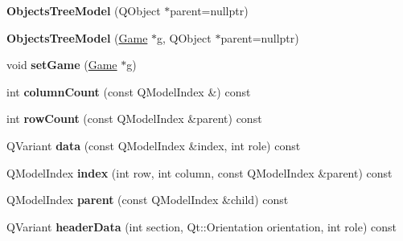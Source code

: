 \begin{DoxyCompactItemize}
\item 
\hypertarget{class_objects_tree_model_a4cc5d9d4f4a979715d93841b8d76c996}{{\bfseries \-Objects\-Tree\-Model} (\-Q\-Object $\ast$parent=nullptr)}\label{class_objects_tree_model_a4cc5d9d4f4a979715d93841b8d76c996}

\item 
\hypertarget{class_objects_tree_model_a0796ddf3bdd9fae95ac199b72e994465}{{\bfseries \-Objects\-Tree\-Model} (\hyperlink{class_game}{\-Game} $\ast$g, \-Q\-Object $\ast$parent=nullptr)}\label{class_objects_tree_model_a0796ddf3bdd9fae95ac199b72e994465}

\item 
\hypertarget{class_objects_tree_model_ad8d730a8f686c922ecdfe4d33bf2c9a8}{void {\bfseries set\-Game} (\hyperlink{class_game}{\-Game} $\ast$g)}\label{class_objects_tree_model_ad8d730a8f686c922ecdfe4d33bf2c9a8}

\item 
\hypertarget{class_objects_tree_model_a41005844e75c80f30b638b50d36653c4}{int {\bfseries column\-Count} (const \-Q\-Model\-Index \&) const }\label{class_objects_tree_model_a41005844e75c80f30b638b50d36653c4}

\item 
\hypertarget{class_objects_tree_model_aa7740390e180a7663e3341a5aa56c49b}{int {\bfseries row\-Count} (const \-Q\-Model\-Index \&parent) const }\label{class_objects_tree_model_aa7740390e180a7663e3341a5aa56c49b}

\item 
\hypertarget{class_objects_tree_model_a98fe0687618c87c84f5519c92d729aa0}{\-Q\-Variant {\bfseries data} (const \-Q\-Model\-Index \&index, int role) const }\label{class_objects_tree_model_a98fe0687618c87c84f5519c92d729aa0}

\item 
\hypertarget{class_objects_tree_model_a8c9f9980e0268c7125f97ce9e45e026d}{\-Q\-Model\-Index {\bfseries index} (int row, int column, const \-Q\-Model\-Index \&parent) const }\label{class_objects_tree_model_a8c9f9980e0268c7125f97ce9e45e026d}

\item 
\hypertarget{class_objects_tree_model_a304b4e2110a7ab9e697d1ace64885792}{\-Q\-Model\-Index {\bfseries parent} (const \-Q\-Model\-Index \&child) const }\label{class_objects_tree_model_a304b4e2110a7ab9e697d1ace64885792}

\item 
\hypertarget{class_objects_tree_model_ae8574c384005c730762b083eb3863d74}{\-Q\-Variant {\bfseries header\-Data} (int section, \-Qt\-::\-Orientation orientation, int role) const }\label{class_objects_tree_model_ae8574c384005c730762b083eb3863d74}


\end{DoxyCompactItemize}
